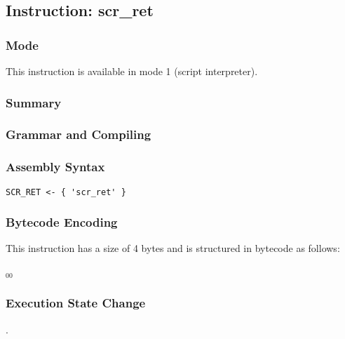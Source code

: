 \subsection{Instruction: scr\_ret}

\subsubsection{Mode}
This instruction is available in mode 1 (script interpreter).
\subsubsection{Summary}


\subsubsection{Grammar and Compiling}


\subsubsection{Assembly Syntax}

\begin{myquote}
\begin{verbatim}
SCR_RET <- { 'scr_ret' }
\end{verbatim}
\end{myquote}

\subsubsection{Bytecode Encoding}

This instruction has a size of 4 bytes and is structured in bytecode as follows:

$_{00}$\ 


\subsubsection{Execution State Change}

.


